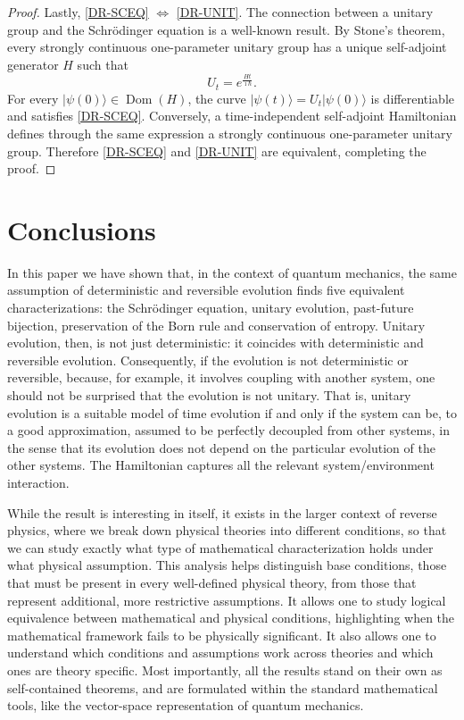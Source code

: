 \documentclass[entropy,article,submit,moreauthors]{Definitions/mdpi}
\def\>{\rangle}
\DeclareMathOperator{\Dom}{Dom}
\begin{document}
\begin{proof}
	Lastly, \ref{DR-SCEQ} $\iff$ \ref{DR-UNIT}. The connection between a unitary group and the Schrödinger equation is a well-known result. By Stone's theorem, every strongly continuous one-parameter unitary group has a unique self-adjoint generator $H$ such that
	\begin{equation}
		U_t=e^{\frac{Ht}{\imath \hbar}}.
	\end{equation}
	For every $|\psi(0)\> \in \Dom(H)$, the curve $| \psi(t) \> =U_t |\psi(0)\>$ is differentiable and satisfies \ref{DR-SCEQ}. Conversely, a time-independent self-adjoint Hamiltonian defines through the same expression a strongly continuous one-parameter unitary group. Therefore \ref{DR-SCEQ} and \ref{DR-UNIT} are equivalent, completing the proof.
\end{proof}

\section{Conclusions}

In this paper we have shown that, in the context of quantum mechanics, the same assumption of deterministic and reversible evolution finds five equivalent characterizations: the Schrödinger equation, unitary evolution, past-future bijection, preservation of the Born rule and conservation of entropy. Unitary evolution, then, is not just deterministic: it coincides with deterministic and reversible evolution. Consequently, if the evolution is not deterministic or reversible, because, for example, it involves coupling with another system, one should not be surprised that the evolution is not unitary. That is, unitary evolution is a suitable model of time evolution if and only if the system can be, to a good approximation, assumed to be perfectly decoupled from other systems, in the sense that its evolution does not depend on the particular evolution of the other systems. The Hamiltonian captures all the relevant system/environment interaction. 

While the result is interesting in itself, it exists in the larger context of reverse physics, where we break down physical theories into different conditions, so that we can study exactly what type of mathematical characterization holds under what physical assumption. This analysis helps distinguish base conditions, those that must be present in every well-defined physical theory, from those that represent additional, more restrictive assumptions. It allows one to study logical equivalence between mathematical and physical conditions, highlighting when the mathematical framework fails to be physically significant. It also allows one to understand which conditions and assumptions work across theories and which ones are theory specific. Most importantly, all the results stand on their own as self-contained theorems, and are formulated within the standard mathematical tools, like the vector-space representation of quantum mechanics.
\end{document}
